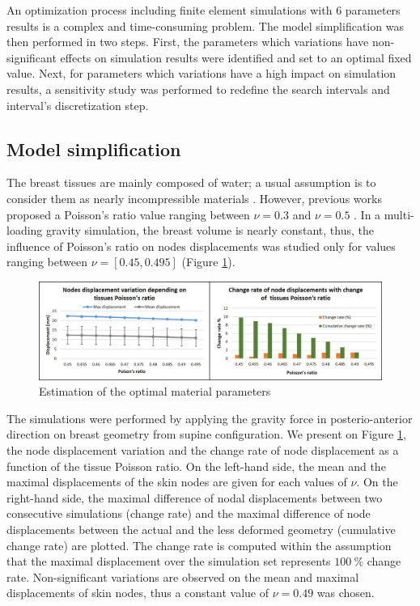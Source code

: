  An optimization process including finite element simulations with 6 parameters results is a complex and time-consuming problem. The model simplification was then performed in two steps. First, the parameters which variations have non-significant effects on simulation results were identified and set to an optimal fixed value. Next, for parameters which variations have a high impact on simulation results, a sensitivity study was performed to redefine the search intervals and interval's discretization step.
 
 \subsection{Model simplification}

The breast tissues are mainly composed of water; a usual assumption is to consider them as nearly incompressible materials \citep{fung_biomechanics_2013}. However,
previous works proposed a Poisson's ratio value ranging between $\nu = 0.3$ \citep{hopp_automatic_2013} and $\nu = 0.5$ \citep{gamage_modelling_2012}. In a multi-loading gravity simulation, the breast volume is nearly constant, thus, the influence of Poisson's ratio on nodes displacements was studied only for values ranging between $\nu = [0.45 , 0.495]$ (Figure \ref{fig:poissonRatio}). 

\begin{figure}[!h]
\centering
\includegraphics[width=\textwidth,keepaspectratio]{figures/poissonRatio.jpg} 
\caption{Estimation of the optimal material parameters}\label{fig:poissonRatio}
\end{figure}

The simulations were performed by applying the gravity force in posterio-anterior direction on breast geometry from supine configuration. We present on Figure \ref{fig:poissonRatio}, the node displacement variation and the change rate of node displacement as a function of the tissue Poisson ratio. On the left-hand side, the mean and the maximal displacements of the skin nodes are given for each values of $\nu$. On the right-hand side, the maximal difference of nodal displacements between two consecutive simulations (change rate) and the maximal difference of node displacements between the actual and the less deformed geometry (cumulative change rate) are plotted. The change rate is computed within the assumption that the maximal displacement over the simulation set represents $100\ \%$ change rate. Non-significant variations are observed on the mean and maximal displacements of skin nodes, thus a constant value of $\nu = 0.49$ was chosen.


